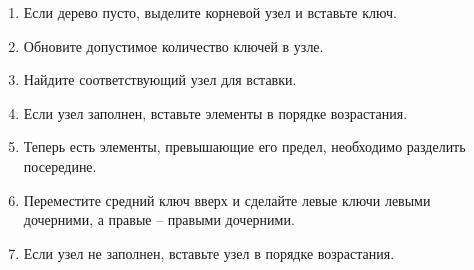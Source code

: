 \begin{enumerate}
    \item Если дерево пусто, выделите корневой узел и вставьте ключ.
    \item Обновите допустимое количество ключей в узле.
    \item Найдите соответствующий узел для вставки.
    \item Если узел заполнен, вставьте элементы в порядке возрастания.
    \item Теперь есть элементы, превышающие его предел, необходимо разделить посередине.
    \item Переместите средний ключ вверх и сделайте левые ключи левыми дочерними, а правые – правыми дочерними.
    \item Если узел не заполнен, вставьте узел в порядке возрастания.
\end{enumerate}